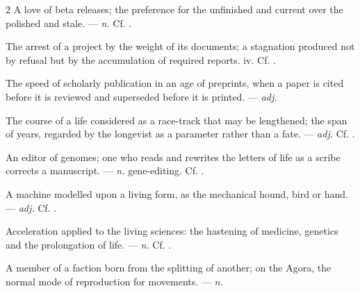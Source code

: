 \begin{multicols}{2}
 A love of beta releases; the preference for the unfinished and current over the polished and stale.  —  \textit{n.} Cf. .

 The arrest of a project by the weight of its documents; a stagnation produced not by refusal but by the accumulation of required reports.   iv. Cf. .

 The speed of scholarly publication in an age of preprints, when a paper is cited before it is reviewed and superseded before it is printed. —  \textit{adj.}

 The course of a life considered as a race-track that may be lengthened; the span of years, regarded by the longevist as a parameter rather than a fate. —  \textit{adj.} Cf. .

 An editor of genomes; one who reads and rewrites the letters of life as a scribe corrects a manuscript.  —  \textit{n.} gene-editing. Cf. .

 A machine modelled upon a living form, as the mechanical hound, bird or hand. —  \textit{adj.} Cf. .

 Acceleration applied to the living sciences: the hastening of medicine, genetics and the prolongation of life.  —  \textit{n.} Cf. .

 A member of a faction born from the splitting of another; on the Agora, the normal mode of reproduction for movements.   —  \textit{n.}


\end{multicols}
